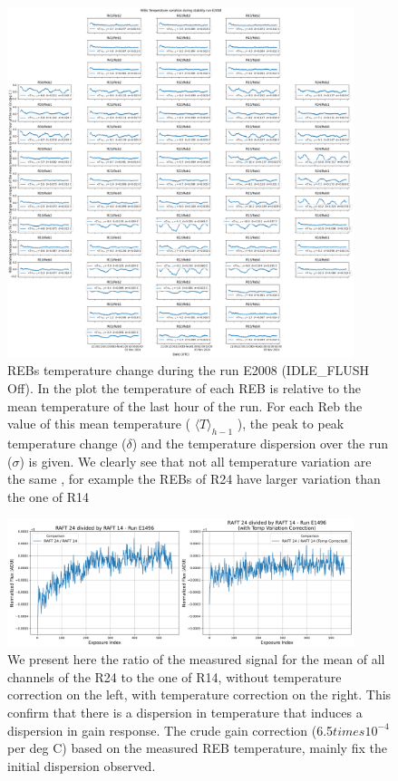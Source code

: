 \begin{figure}[ht]
\begin{centering}
\includegraphics[width=0.9\textwidth]{figures/FocalPlanTempRun_E2008.png}
\end{centering}
\caption{REBs temperature change during the run E2008 (IDLE\_FLUSH Off). In the plot the temperature of each REB is relative to the mean temperature of the last hour of the run. For each Reb the value of this mean temperature ( $\langle T \rangle_{h-1}$ ), the peak to peak temperature change ($\delta$) and the temperature dispersion over the run ($\sigma$) is given. We clearly see that not all temperature variation are the same , for example the REBs of R24 have larger variation than the one of R14} 
\label{fig:tempE2008}
\end{figure}
\begin{figure}[ht] %
\begin{centering}
\includegraphics[width=0.9\textwidth]{figures/raft24div14.png}
\end{centering}
\caption{We present here the ratio of the measured signal for the mean of all channels of the R24 to the one of R14, without temperature correction on the left, with temperature correction on the right. This confirm that there is a  dispersion in temperature that induces a dispersion in gain response. The crude gain correction (6.5$times 10^{-4}$ per deg C) based on the measured REB temperature, mainly fix the initial dispersion observed.   }
\label{fig:R24divR14}
\end{figure}


